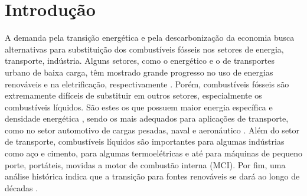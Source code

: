 \section{Introdução}





A demanda pela transição energética e pela descarbonização da economia busca alternativas para substituição dos combustíveis fósseis nos setores de energia, transporte, indústria. 
Alguns setores, como o energético e o de transportes urbano de baixa carga, têm mostrado grande progresso no uso de energias renováveis e na eletrificação, respectivamente \source{}. 
Porém, combustíveis fósseis são extremamente difíceis de substituir em outros setores, especialmente os combustíveis líquidos.
São estes os que possuem maior energia específica e densidade energética , sendo os mais adequados para aplicações de transporte, como no setor automotivo de cargas pesadas, naval e aeronáutico \cite{MasriA2021}.
Além do setor de transporte, combustíveis líquidos são importantes para algumas indústrias como aço e cimento, para algumas termoelétricas e até para máquinas de pequeno porte, portáteis, movidas a motor de combustão interna (MCI).
Por fim, uma análise histórica indica que a transição para fontes renováveis se dará ao longo de décadas \cite{MasriA2021}.


